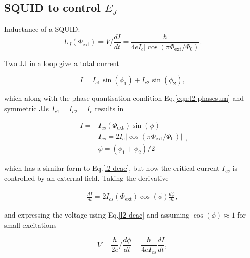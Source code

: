    \subsection{SQUID to control $ E_J $\cite{zhu2010}}
   \begin{framed}\noindent
     Inductance of a SQUID:
     \begin{equation}\label{l2:squid:inductance}
       L_J(\Phi_\text{ext}) = V/\frac{dI}{dt} = \frac{\hbar}{4eI_c|\cos(\pi\Phi_\text{ext}/\Phi_0)}.
     \end{equation}
   \end{framed}

   Two JJ in a loop give a total current

    \begin{equation}
      I = I_{c1}\sin(\phi_1)+I_{c2}\sin(\phi_2),
    \end{equation}

    \noindent  which  along  with   the  phase  quantisation  condition
    Eq.\eqref{eqn:l2-phasesum}  and  symmetric JJs  $I_{c1}=I_{c2}=I_c$
    results in

    \begin{equation}
      \begin{aligned}
        I = & I_{cs}(\Phi_\text{ext})\sin(\phi)\\
        & I_{cs} = 2I_c|\cos(\pi\Phi_\text{ext}/\Phi_0)|\\
        & \phi = (\phi_1+\phi_2)/2
      \end{aligned},
    \end{equation}

    \noindent which has  a similar form to  Eq.\eqref{l2-dcac}, but now
    the  critical  current  $I_{cs}$   is  controlled  by  an  external
    field. Taking the derivative

    \begin{equation}
      \begin{aligned}
        \frac{dI}{dt}=2I_{cs}(\Phi_\text{ext})\cos(\phi)\frac{d\phi}{dt},
      \end{aligned}
    \end{equation}

    \noindent and  expressing the voltage using  Eq.\eqref{l2-dcac} and
    assuming $\cos(\phi)\approx1$ for small excitations

    \begin{equation}
      V = \frac{\hbar}{2e}/\frac{d\phi}{dt} = \frac{\hbar}{4eI_{cs}}\frac{dI}{dt},
    \end{equation}

